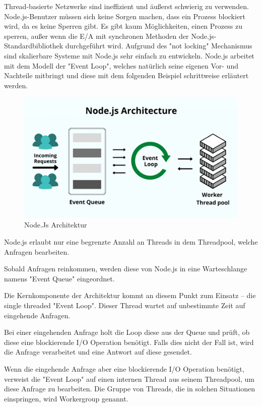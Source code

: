 Thread-basierte Netzwerke sind ineffizient und äußerst schwierig zu verwenden. Node.js-Benutzer müssen sich keine Sorgen machen, dass ein Prozess blockiert wird, da es keine Sperren gibt. Es gibt kaum Möglichkeiten, einen Prozess zu sperren, außer wenn die E/A mit synchronen Methoden der Node.js-Standardbibliothek durchgeführt wird. Aufgrund des "not locking" Mechanismus sind skalierbare Systeme mit Node.js sehr einfach zu entwickeln. 
Node.js arbeitet mit dem Modell der "Event Loop", welches natürlich seine eigenen Vor- und Nachteile mitbringt und diese mit dem folgenden Beispiel schrittweise erläutert werden.


\begin{figure}[H]
    \centering
    \includegraphics{media/NodeJs/NodeJsArchitektur.png}
    \caption{Node.Js Architektur\cite{ArchitekturFoto}}
\end{figure}


Node.js erlaubt nur eine begrenzte Anzahl an Threads in dem Threadpool, welche Anfragen bearbeiten.

Sobald Anfragen reinkommen, werden diese von Node.js in eine Warteschlange namens "Event Queue" eingeordnet. 

Die Kernkomponente der Architektur kommt an diesem Punkt zum Einsatz – die single threaded "Event Loop". Dieser Thread wartet auf unbestimmte Zeit auf eingehende Anfragen.

Bei einer eingehenden Anfrage holt die Loop diese aus der Queue und prüft, ob diese eine blockierende I/O Operation benötigt. Falls dies nicht der Fall ist, wird die Anfrage verarbeitet und eine Antwort auf diese gesendet. 

Wenn die eingehende Anfrage aber eine blockierende I/O Operation benötigt, verweist die "Event Loop" auf einen internen Thread aus seinem Threadpool, um diese Anfrage zu bearbeiten. Die Gruppe von Threads, die in solchen Situationen einspringen, wird Workergroup genannt.

